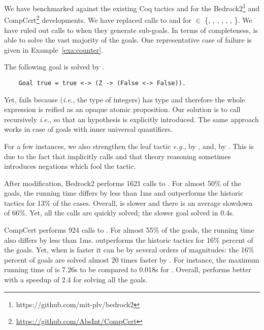 \documentclass[utf8,a4paper,UKenglish,cleveref, autoref, thm-restate]{lipics-v2019}
\begin{document}
We have benchmarked  against the existing Coq tactics
 and  for the
Bedrock2\footnote{https://github.com/mit-plv/bedrock2} and
CompCert\footnote{\url{https://github.com/AbsInt/CompCert}}
developments.
%
We have replaced calls to  and  for
 $\in$ \{, ,
, , , ,
 \}.
%
We have ruled out calls to  when they generate sub-goals.
%
In  terms of  completeness,   is able  to solve  the vast
majority  of the  goals.  One
representative case of failure is given in Example~\ref{exa:counter}. 
\begin{example} The following goal is solved by .
  \label{exa:counter}
  \begin{verbatim}
    Goal true = true <-> (Z -> (False <-> False)).
  \end{verbatim}
  Yet,  fails because  (\emph{i.e.},
  the type of integers) has type  and therefore the whole
  expression  is reified as an opaque
  atomic proposition. Our solution is to call 
  recursively \emph{i.e.},  so that
  an hypothesis  is explicitly introduced. The same approach
  works in case of goals with inner universal quantifiers.
\end{example}
For a few instances, we also strengthen the leaf tactic \emph{e.g.},
 by , and,  by
. This is due to the fact that 
implicitly calls  and that theory reasoning
sometimes introduces negations which fool the  tactic.

After modification, Bedrock2 performs 1621 calls to . For
almost 50\% of the goals, the running time differs by less than 1ms and
 outperforms the historic tactics for 13\% of the
cases. Overall,  is slower and there is an average slowdown of 66\%.
Yet, all the calls are quickly solved; the slower goal solved in 0.4s.

CompCert performs 924 calls to .  For almost 55\% of the
goals, the running time also differs by less than 1ms. 
outperforms the  historic tactics for 16\% percent of the
goals. Yet, when  is faster it can be by several orders
of magnitudes: the 16\% percent of goals are solved almost 20 times
faster by .
%
For instance, the maximum running time of  is 7.26s to be
compared to 0.018s for . Overall,  performs
better with a speedup of 2.4 for solving all the goals.
\end{document}
